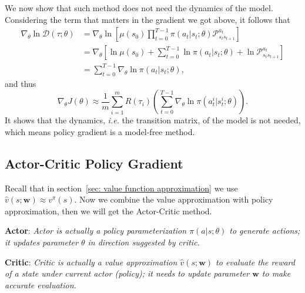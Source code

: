 \documentclass{progartcn}
\begin{document}
		We now show that such method does not need the dynamics of the model. Considering the term that matters in the gradient we got above, it follows that
		\[\begin{aligned} \nabla_{\theta} \ln \mathcal{D}(\tau ; \theta) &=\nabla_{\theta} \ln \left[\mu\left(s_{0}\right) \prod_{t=0}^{T-1} \pi\left(a_{t} | s_{t};\theta\right) \mathcal{P}_{s_ts_{t+1}}^{a_t}\right] \\ 
		&=\nabla_{\theta}\left[\ln \mu\left(s_{0}\right)+\sum_{t=0}^{T-1} \ln \pi\left(a_{t} | s_{t};\theta\right)+\ln \mathcal{P}_{s_ts_{t+1}}^{a_t}\right] \\ &=\sum_{t=0}^{T-1} \nabla_{\theta} \ln \pi\left(a_{t} | s_{t};\theta\right), \end{aligned}\]
		and thus
		\[\nabla_\theta J(\theta)\approx \frac{1}{m}\sum_{i=1}^m R(\tau_i)\left(\sum_{t=0}^{T-1} \nabla_{\theta} \ln \pi(a_{t}^i | s_{t}^i;\theta)\right).\]
		It shows that the dynamics, \textit{i.e.} the transition matrix, of the model is not needed, which means policy gradient is a model-free method.\\
 
	\subsection{Actor-Critic Policy Gradient}

		Recall that in section~\ref{sec: value function approximation} we use $\hat{v}(s;\bm{w})\approx v^\pi(s)$. Now we combine the value approximation with policy approximation, then we will get the Actor-Critic method.

		\textbf{Actor}: \textit{Actor is actually a policy parameterization $\pi(a|s;\theta)$ to generate actions; it updates parameter $\theta$ in direction suggested by critic.}

		\textbf{Critic}: \textit{Critic is actually a value approximation $\hat{v}(s;\bm{w})$ to evaluate the reward of a state under current actor (policy); it needs to update parameter $\bm{w}$ to make accurate evaluation.}
\end{document}
